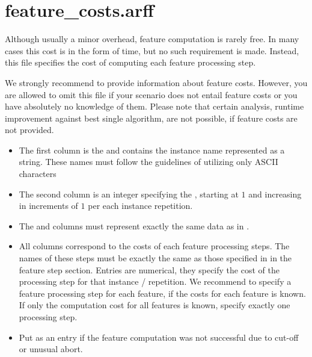 \section{feature\_costs.arff}

Although usually a minor overhead, feature computation is rarely free. In many cases this cost is in the form of 
time, but no such requirement is made. Instead, this file specifies the cost of computing each feature processing step. 

We strongly recommend to provide information about feature costs.
However, you are allowed to omit this file if your scenario does not entail feature costs or you have absolutely no knowledge 
of them. Please note that certain analysis, \eg{} runtime improvement against best single algorithm, are not possible,
if feature costs are not provided.  

\begin{itemize}
  	\item The first column is the  and contains the instance name represented as a string.
  		 These names must follow the guidelines of utilizing only ASCII characters
  	\item The second column is an integer specifying the , starting at $1$ and increasing in 
		increments of $1$ per each instance repetition. 
  	\item The  and  columns must represent exactly the same data 
		as in .
  	\item All columns correspond to the costs of each feature processing steps. The names of these
		steps must be exactly the same as those specified in  in the feature 
		step section. Entries are numerical, they specify the cost of the processing step for that 
		instance / repetition. We recommend to specify a feature processing step for each feature, if
		the costs for each feature is known. If only the computation cost for all features is known,
		specify exactly one processing step.
  	\item Put \qm as an entry if the feature computation was not successful due to cut-off or unusual abort.
\end{itemize}

